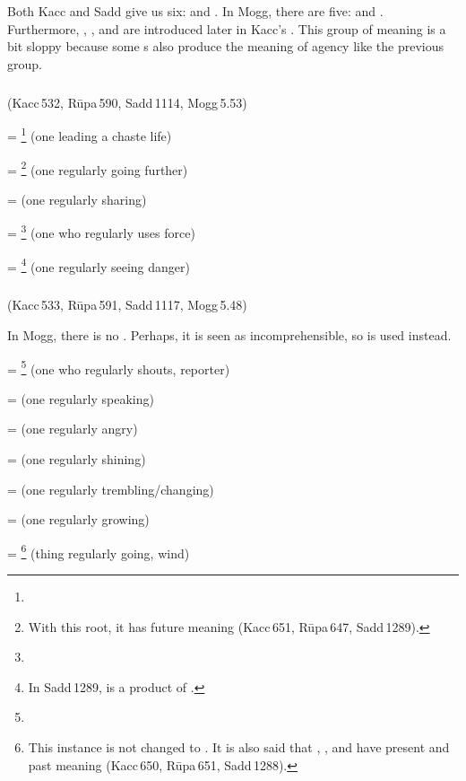Both Kacc and Sadd give us six:  and . In Mogg, there are five:  and . Furthermore, , , and  are introduced later in Kacc's . This group of meaning is a bit sloppy because some s also produce the meaning of agency like the previous group.

\subparagraph*{} (Kacc\,532, R\=upa\,590, Sadd\,1114, Mogg\,5.53)\label{pacck2:dnii}\label{pacck2:tu}\label{pacck2:aavii}

 = \footnote{} (one leading a chaste life)\par
{} = \footnote{ With this root, it has future meaning (Kacc\,651, R\=upa\,647, Sadd\,1289).} (one regularly going further)\par
{} =  (one regularly sharing)\par
{} = \footnote{} (one who regularly uses force)\par
{} = \footnote{ In Sadd\,1289,  is a product of .} (one regularly seeing danger)\par

\subparagraph*{} (Kacc\,533, R\=upa\,591, Sadd\,1117, Mogg\,5.48)\label{pacck2:yu}\label{pacck2:ana}

In Mogg, there is no . Perhaps, it is seen as incomprehensible, so  is used instead.

 = \footnote{} (one who regularly shouts, reporter)\par
{} =  (one regularly speaking)\par
{} =  (one regularly angry)\par
{} =  (one regularly shining)\par
{} =  (one regularly trembling/changing)\par
{} =  (one regularly growing)\par
{} = \footnote{ This instance is not changed to . It is also said that , , and  have present and past meaning (Kacc\,650, R\=upa\,651, Sadd\,1288).} (thing regularly going, wind)\par

